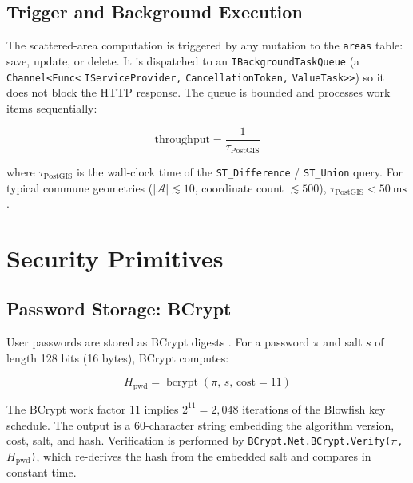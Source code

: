 \documentclass[12pt,a4paper]{article}
\theoremstyle{definition}
\theoremstyle{plain}
\theoremstyle{remark}
\newcommand{\abs}[1]{\left\lvert #1 \right\rvert}
\newcommand{\bcrypt}{\operatorname{bcrypt}}
\begin{document}
\subsection{Trigger and Background Execution}

The scattered-area computation is triggered by any mutation to the
\texttt{areas} table: save, update, or delete. It is dispatched to an
\texttt{IBackgroundTaskQueue} (a \texttt{Channel<Func<}\allowbreak{}
\texttt{IServiceProvider,}\allowbreak{} \texttt{CancellationToken,}\allowbreak{}
\texttt{ValueTask>>}) so it does not block the HTTP response.
The queue is bounded and processes work items sequentially:

\begin{equation}
  \mathrm{throughput} = \frac{1}{\tau_{\text{PostGIS}}}
  \label{eq:queue_throughput}
\end{equation}

where $\tau_{\text{PostGIS}}$ is the wall-clock time of the
\texttt{ST\_Difference} / \texttt{ST\_Union} query. For typical commune
geometries ($\abs{\mathcal{A}} \lesssim 10$, coordinate count
$\lesssim 500$), $\tau_{\text{PostGIS}} < 50\ \mathrm{ms}$.

\section{Security Primitives}
\label{sec:security}

\subsection{Password Storage: BCrypt}

User passwords are stored as BCrypt digests \cite{bcrypt}. For a password $\pi$ and
salt $s$ of length 128 bits (16 bytes), BCrypt computes:

\begin{equation}
  H_{\text{pwd}} = \bcrypt(\pi,\, s,\, \text{cost} = 11)
  \label{eq:bcrypt}
\end{equation}

The BCrypt work factor 11 implies $2^{11} = 2{,}048$ iterations of the
Blowfish key schedule. The output is a 60-character string embedding the
algorithm version, cost, salt, and hash. Verification is performed by
\texttt{BCrypt.Net.BCrypt.Verify($\pi$, $H_{\text{pwd}}$)}, which re-derives
the hash from the embedded salt and compares in constant time.
\end{document}
